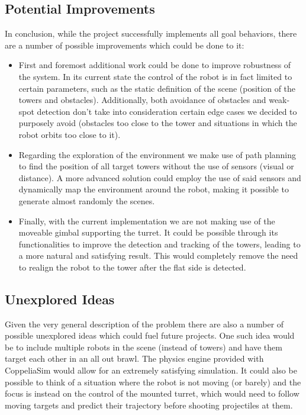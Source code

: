 \subsection{Potential Improvements}
In conclusion, while the project successfully implements all goal behaviors, there are a number of possible improvements which could be done to it:
\begin{itemize}
    \item First and foremost additional work could be done to improve robustness of the system. In its current state the control of the robot is in fact limited to certain parameters, such as the static definition of the scene (position of the towers and obstacles). Additionally, both avoidance of obstacles and weak-spot detection don't take into consideration certain edge cases we decided to purposely avoid (obstacles too close to the tower and situations in which the robot orbits too close to it). 
    \item Regarding the exploration of the environment we make use of path planning to find the position of all target towers without the use of sensors (visual or distance). A more advanced solution could employ the use of said sensors and dynamically map the environment around the robot, making it possible to generate almost randomly the scenes.
    \item Finally, with the current implementation we are not making use of the moveable gimbal supporting the turret. It could be possible through its functionalities to improve the detection and tracking of the towers, leading to a more natural and satisfying result. This would completely remove the need to realign the robot to the tower after the flat side is detected.
\end{itemize} 

\subsection{Unexplored Ideas}
Given the very general description of the problem there are also a number of possible unexplored ideas which could fuel future projects. One such idea would be to include multiple robots in the scene (instead of towers) and have them target each other in an all out brawl. The physics engine provided with CoppeliaSim would allow for an extremely satisfying simulation. It could also be possible to think of a situation where the robot is not moving (or barely) and the focus is instead on the control of the mounted turret, which would need to follow moving targets and predict their trajectory before shooting projectiles at them.